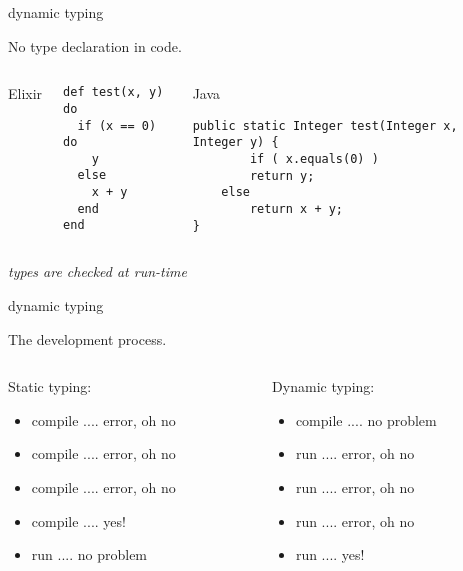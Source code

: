 \begin{frame}[fragile]{dynamic typing}

  No type declaration in code.

  \begin{columns}[t]
   Elixir 
   \begin{column}{0.5\textwidth}
    \begin{lstlisting}
def test(x, y) do
  if (x == 0) do
    y
  else 
    x + y
  end
end
     \end{lstlisting}
   \end{column}\pause
   \begin{column}{0.5\textwidth}
Java
    \begin{lstlisting}
public static Integer test(Integer x, Integer y) {
        if ( x.equals(0) )
	    return y;
	else 
	    return x + y;
}
     \end{lstlisting}
   \end{column}   
 \end{columns}


 \vspace{20pt}
{\em types are checked at run-time}
 
\end{frame}

\begin{frame}{dynamic typing}

  The development process. 
  \vspace{20pt}
  \begin{columns}
   \begin{column}{0.5\textwidth}
     Static typing: \pause
     \begin{itemize}
     \item compile .... error, oh no \pause
     \item compile .... error, oh no \pause
     \item compile .... error, oh no \pause
     \item compile .... yes! \pause
     \item run .... no problem \pause
     \end{itemize}
   \end{column}
   \begin{column}{0.5\textwidth}
     Dynamic typing: \pause
     \begin{itemize}
     \item compile .... no problem \pause
     \item run .... error, oh no \pause
     \item run .... error, oh no \pause
     \item run .... error, oh no \pause
     \item run .... yes! \pause       
     \end{itemize}
   \end{column}   
 \end{columns}

\end{frame}


